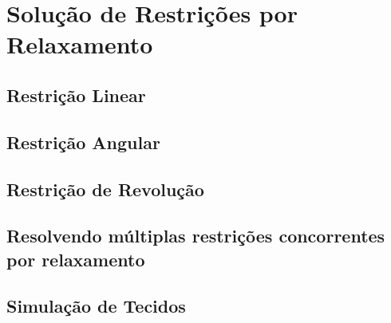\chapter{Solução de Restrições por Relaxamento}

\section{Restrição Linear}

\section{Restrição Angular}

\section{Restrição de Revolução}

\section{Resolvendo múltiplas restrições concorrentes por relaxamento}

\section{Simulação de Tecidos}
